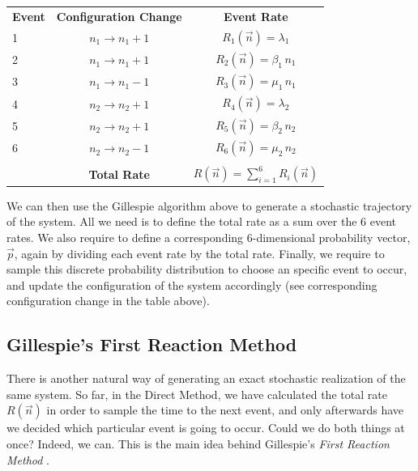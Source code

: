\begin{center}
	\begin{tabular}{lcc}
		\textbf{Event} & \textbf{Configuration Change} & \textbf{Event Rate}                                                               \\
		
		1      & $n_1 \rightarrow n_1 + 1$ & $R_1(\vec{n}) = \lambda_1$              \\
		2      & $n_1 \rightarrow n_1 + 1$ & $R_2(\vec{n}) = \beta_1\,n_1$           \\
		3      & $n_1 \rightarrow n_1 - 1$ & $R_3(\vec{n}) = \mu_1\,n_1$             \\
		4      & $n_2 \rightarrow n_2 + 1$ & $R_4(\vec{n}) = \lambda_2$              \\
		5      & $n_2 \rightarrow n_2 + 1$ & $R_5(\vec{n}) = \beta_2\,n_2$           \\
		6      & $n_2 \rightarrow n_2 - 1$ & $R_6(\vec{n}) = \mu_2\,n_2$             \\
		       &                           &                                         \\
		       & \textbf{Total Rate}       & $R(\vec{n}) = \sum_{i=1}^6 R_i(\vec{n})$
	\end{tabular}
\end{center}
We can then use the Gillespie algorithm above to generate a stochastic trajectory of the system. All we need is to define the total rate as a sum over the 6 event rates. We also require to define a corresponding 6-dimensional probability vector, $\vec{p}$, again by dividing each event rate by the total rate. Finally, we require to sample this discrete probability distribution to choose an specific event to occur, and update the configuration of the system accordingly (see corresponding configuration change in the table above).  
\smallskip

\subsection{Gillespie's First Reaction Method}
There is another natural way of generating an exact stochastic realization of the same system. So far, in the Direct Method, we have calculated the total rate $R(\vec n)$ in order to sample the time to the next event, and only afterwards have we decided which particular event is going to occur. Could we do both things at once? Indeed, we can. This is the main idea behind Gillespie's \emph{First Reaction Method} \citep{Gillespie76}.
\smallskip


